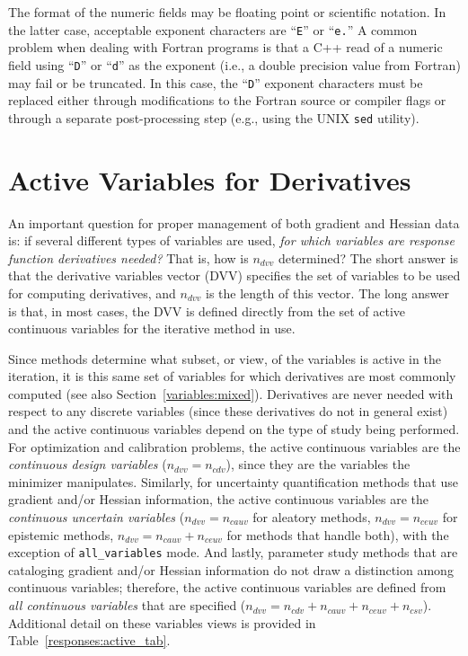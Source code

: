 The format of the numeric fields may be floating point or scientific
notation. In the latter case, acceptable exponent characters are
``\texttt{E}'' or ``\texttt{e.}'' A common problem when dealing with
Fortran programs is that a C++ read of a numeric field using
``\texttt{D}'' or ``\texttt{d}'' as the exponent (i.e., a double
precision value from Fortran) may fail or be truncated. In this case,
the ``\texttt{D}'' exponent characters must be replaced either through
modifications to the Fortran source or compiler flags or through a
separate post-processing step (e.g., using the UNIX \texttt{sed}
utility).

\section{Active Variables for Derivatives}\label{responses:active}

An important question for proper management of both gradient and
Hessian data is: if several different types of variables are used,
\emph{for which variables are response function derivatives needed?}
That is, how is $n_{dvv}$ determined?  The short answer is that the
derivative variables vector (DVV) specifies the set of variables to be
used for computing derivatives, and $n_{dvv}$ is the length of this
vector.  The long answer is that, in most cases, the DVV is defined
directly from the set of active continuous variables for the iterative
method in use.

Since methods determine what subset, or view, of the variables is
active in the iteration, it is this same set of variables for which
derivatives are most commonly computed (see also
Section~\ref{variables:mixed}).  Derivatives are never needed with
respect to any discrete variables (since these derivatives do not in
general exist) and the active continuous variables depend on the type
of study being performed. For optimization and calibration problems,
the active continuous variables are the \emph{continuous design
  variables} ($n_{dvv}=n_{cdv}$), since they are the variables the
minimizer manipulates.  Similarly, for uncertainty quantification
methods that use gradient and/or Hessian information, the active
continuous variables are the \emph{continuous uncertain variables}
($n_{dvv}=n_{cauv}$ for aleatory methods, $n_{dvv}=n_{ceuv}$ for
epistemic methods, $n_{dvv}=n_{cauv}+n_{ceuv}$ for methods that handle
both), with the exception of \texttt{all\_variables} mode.  And
lastly, parameter study methods that are cataloging gradient and/or
Hessian information do not draw a distinction among continuous
variables; therefore, the active continuous variables are defined from
\emph{all continuous variables} that are specified
($n_{dvv}=n_{cdv}+n_{cauv}+n_{ceuv}+n_{csv}$).  Additional detail on
these variables views is provided in Table~\ref{responses:active_tab}.

